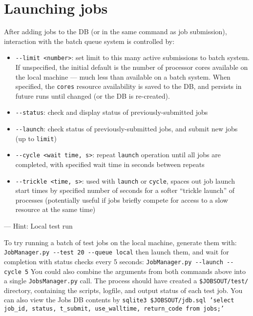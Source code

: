 \documentclass[12pt,english]{article}
\newenvironment{hint}[1][{}]{
\definecolor{shadecolor}{rgb}{.9,.9,.9}
\begin{shaded}
{\color{purple}--- Hint: #1}

}{\end{shaded}}
\newcommand{\cd}[1]{\texorpdfstring{{\color{blue} \texttt{#1}}}{#1}}
\begin{document}
\section{Launching jobs}

After adding jobs to the DB (or in the same command as job submission),
    interaction with the batch queue system is controlled by:
\begin{itemize}
    \item \cd{{-}{-}limit <number>}: set limit to this many active submissions to batch system.
        If unspecified, the initial default is the number of processor cores available on the local machine
            --- much less than available on a batch system.
        When specified, the \cd{cores} resource availability is saved to the DB, and persists
        in future runs until changed (or the DB is re-created).
    \item \cd{{-}{-}status}: check and display status of previously-submitted jobs
    \item \cd{{-}{-}launch}: check status of previously-submitted jobs, and submit new jobs (up to \cd{limit})
    \item \cd{{-}{-}cycle <wait time, s>}: repeat \cd{launch} operation until all jobs are completed,
        with specified wait time in seconds between repeats
    \item \cd{{-}{-}trickle <time, s>}: used with \cd{launch} or \cd{cycle}, spaces out job launch start times
        by specified number of seconds for a softer ``trickle launch'' of processes
        (potentially useful if jobs briefly compete for access to a slow resource at the same time)
\end{itemize}

\begin{hint}[Local test run]
To try running a batch of test jobs on the local machine, generate them with: \newline
\cd{JobManager.py {-}{-}test 20 {-}{-}queue local} \newline
then launch them, and wait for completion with status checks every 5 seconds: \newline
\cd{JobManager.py {-}{-}launch {-}{-}cycle 5} \newline
You could also combine the arguments from both commands above into a single \cd{JobsManager.py} call.
The process should have created a \cd{\$JOBSOUT/test/} directory,
    containing the scripts, logfile, and output status of each test job.
You can also view the Jobs DB contents by \newline
\cd{sqlite3 \$JOBSOUT/jdb.sql 'select job\_id, status, t\_submit, use\_walltime, return\_code from jobs;'}
\end{hint}
\end{document}
